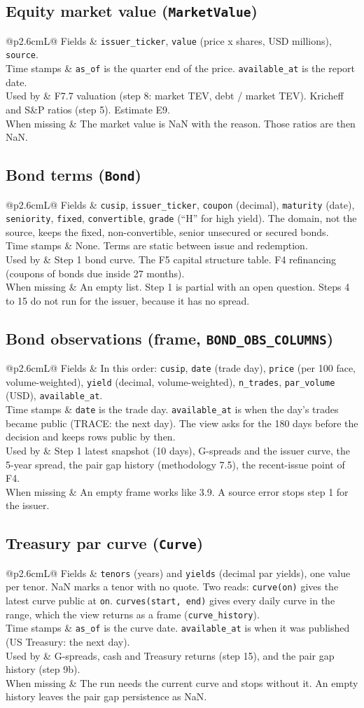 \documentclass[11pt,a4paper]{article}
\makeatletter
\newcommand{\code}[1]{\texttt{\small #1}}
\newcommand{\kind}[5]{%
\subsection{#1}
\noindent\begin{tabularx}{\linewidth}{@{}p{2.6cm}L@{}}
\toprule
Fields & #2\\\midrule
Time stamps & #3\\\midrule
Used by & #4\\\midrule
When missing & #5\\\bottomrule
\end{tabularx}}
\makeatother
\begin{document}
\kind{Equity market value (\code{MarketValue})}
{\code{issuer\_ticker}, \code{value} (price x shares, USD millions), \code{source}.}
{\code{as\_of} is the quarter end of the price. \code{available\_at} is the report date.}
{F7.7 valuation (step 8: market TEV, debt / market TEV). Kricheff and S\&P ratios (step 5). Estimate E9.}
{The market value is NaN with the reason. Those ratios are then NaN.}

\kind{Bond terms (\code{Bond})}
{\code{cusip}, \code{issuer\_ticker}, \code{coupon} (decimal), \code{maturity} (date), \code{seniority}, \code{fixed},
\code{convertible}, \code{grade} (``H'' for high yield). The domain, not the source, keeps the fixed, non-convertible,
senior unsecured or secured bonds.}
{None. Terms are static between issue and redemption.}
{Step 1 bond curve. The F5 capital structure table. F4 refinancing (coupons of bonds due inside 27 months).}
{An empty list. Step 1 is partial with an open question. Steps 4 to 15 do not run for the issuer, because it has no
spread.}

\kind{Bond observations (frame, \code{BOND\_OBS\_COLUMNS})}
{In this order: \code{cusip}, \code{date} (trade day), \code{price} (per 100 face, volume-weighted), \code{yield}
(decimal, volume-weighted), \code{n\_trades}, \code{par\_volume} (USD), \code{available\_at}.}
{\code{date} is the trade day. \code{available\_at} is when the day's trades became public (TRACE: the next day). The
view asks for the 180 days before the decision and keeps rows public by then.}
{Step 1 latest snapshot (10 days), G-spreads and the issuer curve, the 5-year spread, the pair gap history
(methodology 7.5), the recent-issue point of F4.}
{An empty frame works like 3.9. A source error stops step 1 for the issuer.}

\kind{Treasury par curve (\code{Curve})}
{\code{tenors} (years) and \code{yields} (decimal par yields), one value per tenor. NaN marks a tenor with no quote.
Two reads: \code{curve(on)} gives the latest curve public at \code{on}. \code{curves(start, end)} gives every daily
curve in the range, which the view returns as a frame (\code{curve\_history}).}
{\code{as\_of} is the curve date. \code{available\_at} is when it was published (US Treasury: the next day).}
{G-spreads, cash and Treasury returns (step 15), and the pair gap history (step 9b).}
{The run needs the current curve and stops without it. An empty history leaves the pair gap persistence as NaN.}
\end{document}
